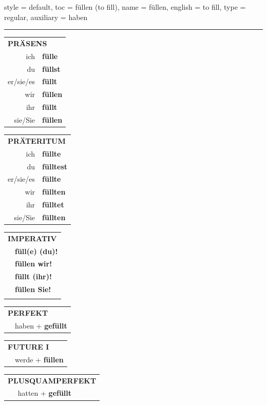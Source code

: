 \begin{verbentry}{
  style = {default},
  toc = {füllen (to fill)},
  name = {füllen},
  english = {to fill},
  type = {regular},
  auxiliary = {haben}
}
 
    
     \vspace{5pt}

    \hrule
    
    \vspace{5pt}

  \begin{tabular}{rl}
     \multicolumn{2}{l}{\textbf{PRÄSENS} }\\
    ich & \textbf{fülle}\\
    du & \textbf{füllst}\\
    er/sie/es & \textbf{füllt}\\
    wir & \textbf{füllen}\\
    ihr & \textbf{füllt}\\
    sie/Sie & \textbf{füllen}\\
  \end{tabular}
  \hfill
     \begin{tabular}{rl}
    \multicolumn{2}{l}{\textbf{PRÄTERITUM} }\\
    ich & \textbf{füllte}\\
    du & \textbf{fülltest}\\
    er/sie/es & \textbf{füllte}\\
    wir & \textbf{füllten}\\
    ihr & \textbf{fülltet}\\
    sie/Sie & \textbf{füllten}\\
  \end{tabular}
  \hfill
  \begin{tabular}{rl}
     \multicolumn{2}{l}{\textbf{IMPERATIV} }\\
   & \textbf{füll(e) (du)!}\\
   & \textbf{füllen wir!}\\
   & \textbf{füllt (ihr)!}\\
   & \textbf{füllen Sie!}\\
   & \vspace{10pt}
  \end{tabular}

    \vspace{10pt}

 \begin{tabular}{rl}
     \multicolumn{2}{l}{\textbf{PERFEKT}}\\
   & haben + \textbf{gefüllt}\\
  \end{tabular}
\hfill
   \begin{tabular}{rl}
    \multicolumn{2}{l}{\textbf{FUTURE I} }\\
   & werde + \textbf{füllen}\\
  \end{tabular}
\hfill
   \begin{tabular}{rl}
      \multicolumn{2}{l}{\textbf{PLUSQUAMPERFEKT}}\\
   & hatten + \textbf{gefüllt}\\
  \end{tabular}


\end{verbentry}
